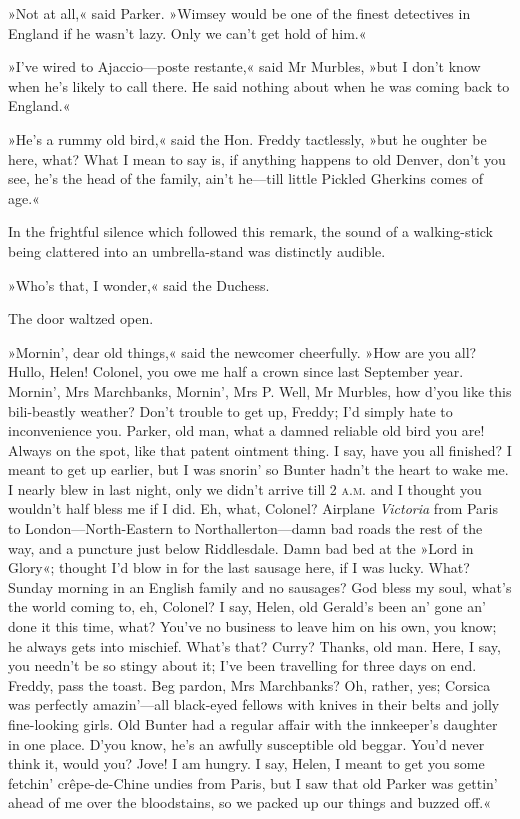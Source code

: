»Not at all,« said Parker. »Wimsey would be one of the finest detectives in England if he wasn't lazy. Only we can't get hold of him.«

»I've wired to Ajaccio—poste restante,« said Mr Murbles, »but I don't know when he's likely to call there. He said nothing about when he was coming back to England.«

»He's a rummy old bird,« said the Hon. Freddy tactlessly, »but he oughter be here, what? What I mean to say is, if anything happens to old Denver, don't you see, he's the head of the family, ain't he—till little Pickled Gherkins comes of age.«

In the frightful silence which followed this remark, the sound of a walking-stick being clattered into an umbrella-stand was distinctly
audible.

»Who's that, I wonder,« said the Duchess.

The door waltzed open.

»Mornin', dear old things,« said the newcomer cheerfully. »How are you all? Hullo, Helen! Colonel, you owe me half a crown since last September year. Mornin', Mrs Marchbanks, Mornin', Mrs P. Well, Mr  Murbles, how d'you like this bili-beastly weather? Don't trouble to get up, Freddy; I'd simply hate to inconvenience you. Parker, old man, what a damned reliable old bird you are! Always on the spot, like that patent ointment thing. I say, have you all finished? I meant to get up earlier, but I was snorin' so Bunter hadn't the heart to wake me. I nearly blew in last night, only we didn't arrive till 2 \textsc{a.m.} and I thought you wouldn't half bless me if I did. Eh, what, Colonel? Airplane \textit{Victoria} from Paris to London—North-Eastern to Northallerton—damn bad roads the rest of the way, and a puncture just below Riddlesdale. Damn bad bed at the »Lord in Glory«; thought I'd blow in for the last sausage here, if I was lucky. What? Sunday morning in an English family and no sausages? God bless my soul, what's the world coming to, eh, Colonel? I say, Helen, old Gerald's been an' gone an' done it this time, what? You've no business to leave him on his own, you know; he always gets into mischief. What's that? Curry? Thanks, old man. Here, I say, you needn't be so stingy about it; I've been travelling for three days on end. Freddy, pass the toast. Beg pardon, Mrs Marchbanks? Oh, rather, yes; Corsica was perfectly amazin'—all black-eyed fellows with knives in their belts and jolly fine-looking girls. Old Bunter had a regular affair with the innkeeper's daughter in one place. D'you know, he's an awfully susceptible old beggar. You'd never think it, would you? Jove! I am hungry. I say, Helen, I meant to get you some fetchin' crêpe-de-Chine undies from Paris, but I saw that old Parker was gettin' ahead of me over the bloodstains, so we packed up our things and buzzed off.«

